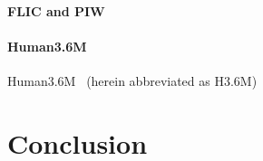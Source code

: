 \documentclass[runningheads]{llncs}
\begin{document}
\paragraph{FLIC and PIW}




\paragraph{Human3.6M} Human3.6M~\cite{ionescu2014human,ionescu2011latent} (herein abbreviated as H3.6M)



\section{Conclusion}
\end{document}
